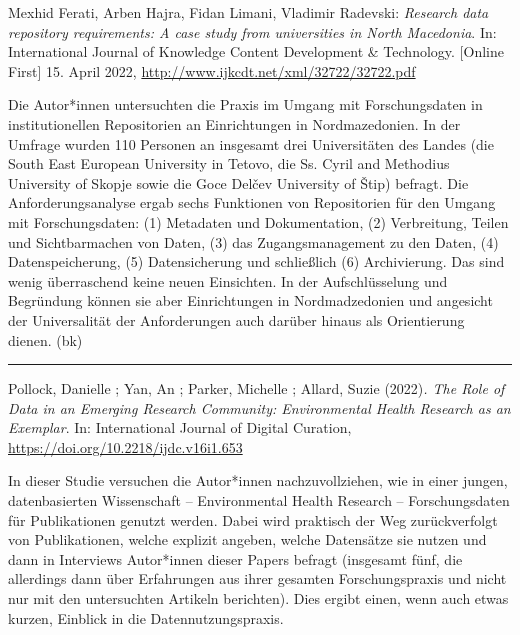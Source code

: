 \documentclass[a4paper,
fontsize=11pt,
oneside,
numbers=noperiodatend,
parskip=half-,
bibliography=totoc,
final
]{scrartcl}
\begin{document}
Mexhid Ferati, Arben Hajra, Fidan Limani, Vladimir Radevski:
\emph{Research data repository requirements: A case study from
universities in North Macedonia}. In: International Journal of Knowledge
Content Development \& Technology. {[}Online First{]} 15. April 2022,
\url{http://www.ijkcdt.net/xml/32722/32722.pdf}

Die Autor*innen untersuchten die Praxis im Umgang mit Forschungsdaten in
institutionellen Repositorien an Einrichtungen in Nordmazedonien. In der
Umfrage wurden 110 Personen an insgesamt drei Universitäten des Landes
(die South East European University in Tetovo, die Ss. Cyril and
Methodius University of Skopje sowie die Goce Delčev University of Štip)
befragt. Die Anforderungsanalyse ergab sechs Funktionen von Repositorien
für den Umgang mit Forschungsdaten: (1) Metadaten und Dokumentation, (2)
Verbreitung, Teilen und Sichtbarmachen von Daten, (3) das
Zugangsmanagement zu den Daten, (4) Datenspeicherung, (5) Datensicherung
und schließlich (6) Archivierung. Das sind wenig überraschend keine
neuen Einsichten. In der Aufschlüsselung und Begründung können sie aber
Einrichtungen in Nordmadzedonien und angesicht der Universalität der
Anforderungen auch darüber hinaus als Orientierung dienen. (bk)

\begin{center}\rule{0.5\linewidth}{0.5pt}\end{center}

Pollock, Danielle ; Yan, An ; Parker, Michelle ; Allard, Suzie
(2022)\emph{. The Role of Data in an Emerging Research Community:
Environmental Health Research as an Exemplar}. In: International Journal
of Digital Curation, \url{https://doi.org/10.2218/ijdc.v16i1.653}

In dieser Studie versuchen die Autor*innen nachzuvollziehen, wie in
einer jungen, datenbasierten Wissenschaft -- Environmental Health
Research -- Forschungsdaten für Publikationen genutzt werden. Dabei wird
praktisch der Weg zurückverfolgt von Publikationen, welche explizit
angeben, welche Datensätze sie nutzen und dann in Interviews Autor*innen
dieser Papers befragt (insgesamt fünf, die allerdings dann über
Erfahrungen aus ihrer gesamten Forschungspraxis und nicht nur mit den
untersuchten Artikeln berichten). Dies ergibt einen, wenn auch etwas
kurzen, Einblick in die Datennutzungspraxis.
\end{document}
